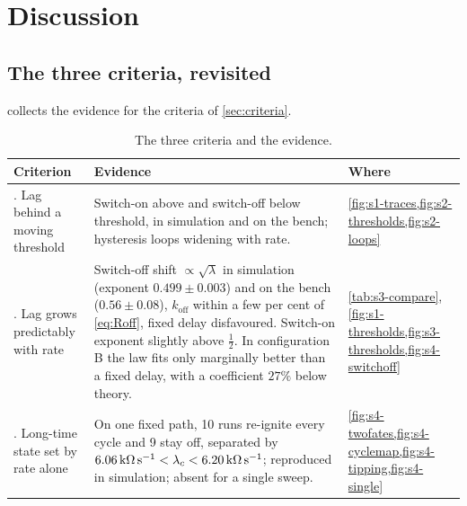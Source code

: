 \chapter{Discussion}\label{ch:discussion}
\chapterlists[t]

\section{The three criteria, revisited}\label{sec:criteria-revisited}

 collects the evidence for the criteria of \cref{sec:criteria}.

\begin{table}[!htb]
  \centering
  \small
  \renewcommand{\arraystretch}{1.3}
  \begin{tabularx}{\linewidth}{@{}>{\raggedright\arraybackslash}p{3.2cm}>{\raggedright\arraybackslash}X>{\raggedright\arraybackslash}p{2.1cm}@{}}
    \toprule
    \textbf{Criterion} & \textbf{Evidence} & \textbf{Where} \\
    \midrule
    1. Lag behind a moving threshold &
      Switch-on above and switch-off below threshold, in simulation and on the bench; hysteresis loops
      widening with rate. &
      \cref{fig:s1-traces,fig:s2-thresholds,fig:s2-loops} \\
    2. Lag grows predictably with rate &
      Switch-off shift $\propto\sqrt{\lambda}$ in simulation (exponent $0.499\pm0.003$) and on the bench
      ($0.56\pm0.08$), $k_{\mathrm{off}}$ within a few per cent of \eqref{eq:Roff}, fixed delay disfavoured.
      Switch-on exponent slightly above $\tfrac12$. In configuration B the law fits only marginally better
      than a fixed delay, with a coefficient $27\%$ below theory. &
      \cref{tab:s3-compare}, \cref{fig:s1-thresholds,fig:s3-thresholds,fig:s4-switchoff} \\
    3. Long-time state set by rate alone &
      On one fixed path, 10 runs re-ignite every cycle and 9 stay off, separated by
      $\SI{6.06}{\kilo\ohm\per\second}<\lambda_{c}<\SI{6.20}{\kilo\ohm\per\second}$; reproduced in simulation;
      absent for a single sweep. &
      \cref{fig:s4-twofates,fig:s4-cyclemap,fig:s4-tipping,fig:s4-single} \\
    \bottomrule
  \end{tabularx}
  \caption[The three criteria and the evidence for each]{The three criteria and the evidence.}
  \label{tab:criteria-evidence}
\end{table}

